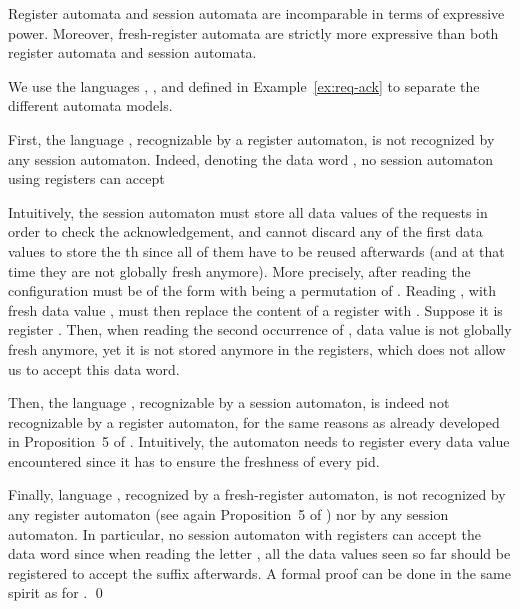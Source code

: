 \documentclass{LMCS}
\begin{document}
\begin{prop}
  Register automata and session automata are incomparable in terms of expressive power.  Moreover,
  fresh-register automata are strictly more expressive than both
  register automata and session automata.
\end{prop}
\proof
  We use the languages , , and  defined in
  Example~\ref{ex:req-ack} to separate the different automata models.

  First, the language , recognizable by a register automaton, is not
  recognized by any session automaton. Indeed, denoting  the data
  word , no session automaton using  registers
  can accept
  
  Intuitively, the session automaton must store all  data values
  of the requests in order to check the acknowledgement, and cannot
  discard any of the  first data values to store the th
  since all of them have to be reused afterwards (and at that time
  they are not globally fresh anymore). More precisely, after reading
   the configuration must be of the form
   with  being a permutation of
  . Reading , with fresh data value ,
  must then replace the content of a register with . Suppose it
  is register . Then, when reading the second occurrence of ,
  data value  is not globally fresh anymore, yet it is not stored
  anymore in the registers, which does not allow us to accept this
  data word.
  
  Then, the language , recognizable by a session automaton, is
  indeed not recognizable by a register automaton, for the same
  reasons as already developed in Proposition~5 of
  \cite{Kaminski1994}. Intuitively, the automaton needs to register
  every data value encountered since it has to ensure the freshness of
  every pid.

  Finally, language , recognized by a fresh-register automaton,
  is not recognized by any register automaton (see again Proposition~5
  of \cite{Kaminski1994}) nor by any session automaton. In particular, no
  session automaton with  registers can accept the data word
   since when reading the letter , all
  the  data values seen so far should be registered to accept the
  suffix afterwards. A formal proof can be done in the same spirit as
  for . \qed
\end{document}
